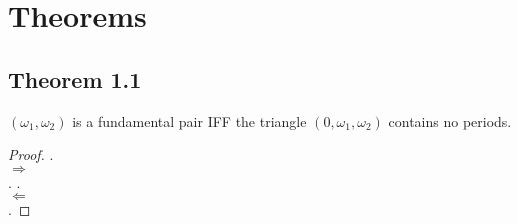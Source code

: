 \newpage
\section{Theorems}

\subsection*{Theorem 1.1}

\begin{proposition}
    $(\omega_1, \omega_2)$ is a fundamental pair IFF the triangle $(0, \omega_1, \omega_2)$ contains no periods.
\end{proposition}

\begin{proof}
    . \\
    $\Rightarrow$ \\
    .
    . \\
    $\Leftarrow$ \\
    .
\end{proof}